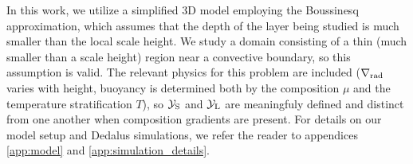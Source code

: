 In this work, we utilize a simplified 3D model employing the Boussinesq approximation, which assumes that the depth of the layer being studied is much smaller than the local scale height.
We study a domain consisting of a thin (much smaller than a scale height) region near a convective boundary, so this assumption is valid.
The relevant physics for this problem are included ($\nabla_{\rm{rad}}$ varies with height, buoyancy is determined both by the composition $\mu$ and the temperature stratification $T$), so $\mathcal{Y}_{\rm{S}}$ and $\mathcal{Y}_{\rm{L}}$ are meaningfuly defined and distinct from one another when composition gradients are present.
For details on our model setup and Dedalus simulations, we refer the reader to appendices \ref{app:model} and \ref{app:simulation_details}.
